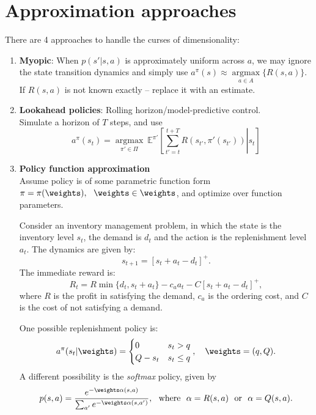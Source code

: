 \section{Approximation approaches}
There are 4 approaches to handle the curses of dimensionality:
\begin{enumerate}\negspace
\item \textbf{Myopic}: When $p(s'|s,a)$ is approximately uniform across $a$, we may ignore the state transition dynamics and simply use $a^\pi(s)\approx \underset{a \in A}{\operatorname{argmax}} \{R(s,a)\}$. If $R(s,a)$ is not known exactly -- replace it with an estimate.

\item \textbf{Lookahead policies}: Rolling horizon/model-predictive control.\\
Simulate a horizon of $T$ steps, and use
$$a^\pi(s_t) = \underset{\pi' \in \Pi}{\operatorname{argmax}}\  \mathbb{E}^{\pi'} \left[\left.\sum_{t'=t}^{t+T} R(s_{t'},\pi'(s_{t'}))\right|s_t\right]$$

\item \textbf{Policy function approximation}\\
Assume policy is of some parametric function form $\pi = \pi(\weights), \ \ \weights \in \weights$, and optimize over function parameters.\\
\begin{example}
Consider an inventory management problem, in which the state is the inventory level $s_t$, the demand is $d_t$ and the action is the replenishment level $a_t$. The dynamics are given by:
$$s_{t+1} = [s_t + a_t-d_t]^+.$$
The immediate reward is:
$$R_t = R \min\{d_t,s_t+a_t\} - c_a a_t -C[s_t + a_t-d_t]^+,$$
where $R$ is the profit in satisfying the demand, $c_a$ is the ordering cost, and $C$ is the cost of not satisfying a demand.

One possible replenishment policy is:
$$a^\pi(s_t|\weights) = \begin{cases} 0 & s_t > q\\Q-s_t & s_t \le q \end{cases}, \ \ \ \weights=(q,Q).$$
A different possibility is the \emph{softmax} policy, given by
$$p(s,a) = \frac{e^{-\weights\alpha(s,a)}}{\sum_{a'} e^{-\weights\alpha(s,a')}}, \ \ \mathrm{where}\ \ \alpha=R(s,a)\ \ \mathrm{or} \ \ \alpha=Q(s,a).$$
\end{example}


\end{enumerate}
